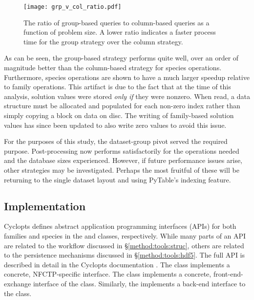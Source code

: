 \begin{figure}
  \begin{center}
    \texttt{[image: grp\_v\_col\_ratio.pdf]}
    \caption{
      \label{fig:col_grp}
      The ratio of group-based queries to column-based queries as a function of
      problem size. A lower ratio indicates a faster process time for the group
      strategy over the column strategy.}
  \end{center}
\end{figure}

As can be seen, the group-based strategy performs quite well, over an order of
magnitude better than the column-based strategy for species
operations. Furthermore, species operations are shown to have a much larger
speedup relative to family operations. This artifact is due to the fact that at
the time of this analysis, solution values were stored \textit{only if} they
were nonzero. When read, a data structure must be allocated and populated for
each non-zero index rather than simply copying a block on data on disc. The
writing of family-based solution values has since been updated to also write
zero values to avoid this issue.

For the purposes of this study, the dataset-group pivot served the required
purpose. Post-processing now performs satisfactorily for the operations needed
and the database sizes experienced. However, if future performance issues arise,
other strategies may be investigated. Perhaps the most fruitful of these will be
returning to the single dataset layout and using PyTable's indexing feature. 

\subsection{Implementation}

Cyclopts defines abstract application programming interfaces (APIs) for both
families and species in the  and 
classes, respectively. While many parts of an API are related to the workflow
discussed in \S \ref{method:tools:struc}, others are related to the persistence
mechanisms discussed in \S \ref{method:tools:hdf5}. The full API is described in
detail in the Cyclopts documentation \cite{cyclopts}. The 
class implements a concrete, NFCTP-specific  interface. The
 class implements a concrete, front-end-exchange
interface of the  class. Similarly, the
 implements a back-end interface to the class.

